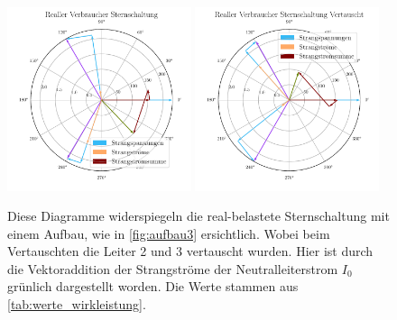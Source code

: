 \documentclass[12pt,english,ngerman]{scrartcl}
\begin{document}
\begin{figure}[H]
	\begin{center}
		\includegraphics[width = 0.48\textwidth]{figures/zeigerSternReal.pdf}
		\includegraphics[width = 0.48\textwidth]{figures/zeigerSternRealVertauscht.pdf}
	\end{center}
	\caption[Zeigerdiagramme einer real-belastete Sternschaltung und dessen vertauschten
		Leiter]{Diese Diagramme widerspiegeln die real-belastete Sternschaltung mit
		einem Aufbau, wie in \autoref{fig:aufbau3} ersichtlich. Wobei beim Vertauschten
		die Leiter 2 und 3 vertauscht wurden. Hier ist durch die Vektoraddition der
		Strangströme der Neutralleiterstrom $I_0$ grünlich dargestellt worden. Die
		Werte stammen aus \autoref{tab:werte_wirkleistung}.
	}\label{fig:zeigerSternReal}
\end{figure}
\end{document}
